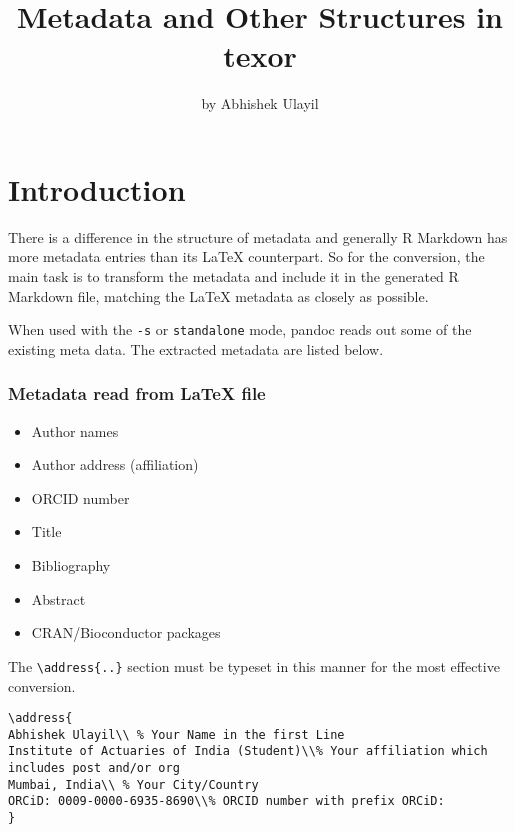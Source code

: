 \title{Metadata and Other Structures in texor}
\author{by Abhishek Ulayil}

\maketitle


\section{Introduction}
There is a difference in the structure of metadata and generally R Markdown has more
metadata entries than its LaTeX counterpart. So for the conversion, the main task is to 
transform the metadata and include it in the generated R Markdown file, matching the
LaTeX metadata as closely as possible.

When used with the \verb|-s| or \verb|standalone| mode, pandoc reads out some of the existing
meta data. The extracted metadata are listed below.


\subsubsection{Metadata read from LaTeX file}

\begin{itemize}
  \item Author names 
  \item Author address (affiliation)
  \item ORCID number
  \item Title
  \item Bibliography
  \item Abstract
  \item CRAN/Bioconductor packages
\end{itemize}

The \verb|\address{..}| section must be typeset in this manner for the most 
effective conversion.
\begin{verbatim}
\address{
Abhishek Ulayil\\ % Your Name in the first Line
Institute of Actuaries of India (Student)\\% Your affiliation which includes post and/or org
Mumbai, India\\ % Your City/Country
ORCiD: 0009-0000-6935-8690\\% ORCID number with prefix ORCiD: 
}
\end{verbatim}

